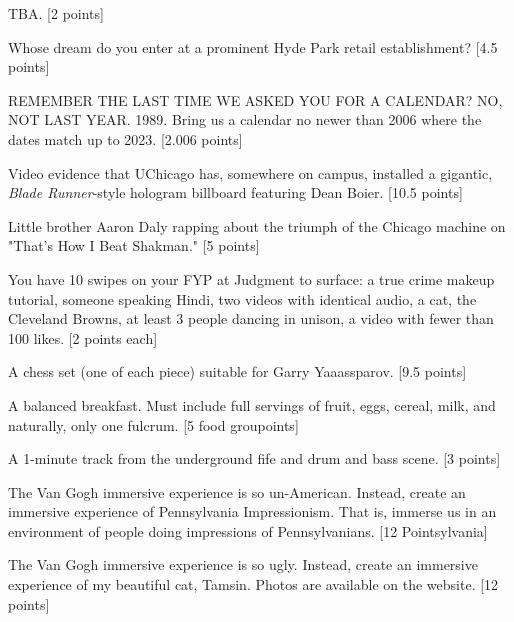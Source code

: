 \documentclass{book}
\begin{document}
\begin{list}{}{}
\item TBA. [2 points] %
\item Whose dream do you enter at a prominent Hyde Park retail establishment? [4.5 points]
\item REMEMBER THE LAST TIME WE ASKED YOU FOR A CALENDAR? NO, NOT LAST YEAR. 1989. Bring us a calendar no newer than 2006 where
the dates match up to 2023. [2.006 points]
\item Video evidence that UChicago	 has, somewhere on campus, installed a gigantic, \textit{Blade Runner}-style hologram billboard featuring Dean Boier. [10.5 points]
\item Little brother Aaron Daly rapping about the triumph of the Chicago machine on "That's How I Beat Shakman." [5 points]
\item You have 10 swipes on your FYP at Judgment to surface: a true crime makeup tutorial, someone speaking Hindi, two videos with identical audio, a cat, the Cleveland Browns, at least 3 people dancing in unison, a video with fewer than 100 likes. [2 points each]
\item A chess set (one of each piece) suitable for Garry Yaaassparov. [9.5 points]
\item A balanced breakfast. Must include full servings of fruit, eggs, cereal, milk, and naturally, only one fulcrum. [5 food groupoints]
\item A 1-minute track from the underground fife and drum and bass scene. [3 points] \textleaf
\item The Van Gogh immersive experience is so un-American. Instead, create an immersive experience of Pennsylvania Impressionism. That is, immerse us in an environment of people doing impressions of Pennsylvanians. [12 Pointsylvania]
\item The Van Gogh immersive experience is so ugly. Instead, create an immersive experience of my beautiful cat, Tamsin. Photos are available on the website. [12 points]


\end{list}
\end{document}

